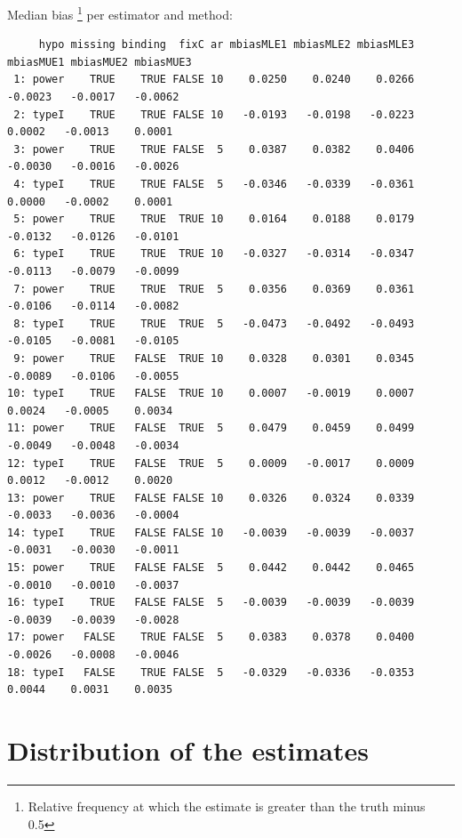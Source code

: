 \documentclass[12pt]{article}
\begin{document}
Median bias \footnote{Relative frequency at which the estimate is greater than the truth minus 0.5} per estimator and method:
\begin{adjustwidth}{-1cm}{-1cm}
\begin{verbatim}
     hypo missing binding  fixC ar mbiasMLE1 mbiasMLE2 mbiasMLE3 mbiasMUE1 mbiasMUE2 mbiasMUE3
 1: power    TRUE    TRUE FALSE 10    0.0250    0.0240    0.0266   -0.0023   -0.0017   -0.0062
 2: typeI    TRUE    TRUE FALSE 10   -0.0193   -0.0198   -0.0223    0.0002   -0.0013    0.0001
 3: power    TRUE    TRUE FALSE  5    0.0387    0.0382    0.0406   -0.0030   -0.0016   -0.0026
 4: typeI    TRUE    TRUE FALSE  5   -0.0346   -0.0339   -0.0361    0.0000   -0.0002    0.0001
 5: power    TRUE    TRUE  TRUE 10    0.0164    0.0188    0.0179   -0.0132   -0.0126   -0.0101
 6: typeI    TRUE    TRUE  TRUE 10   -0.0327   -0.0314   -0.0347   -0.0113   -0.0079   -0.0099
 7: power    TRUE    TRUE  TRUE  5    0.0356    0.0369    0.0361   -0.0106   -0.0114   -0.0082
 8: typeI    TRUE    TRUE  TRUE  5   -0.0473   -0.0492   -0.0493   -0.0105   -0.0081   -0.0105
 9: power    TRUE   FALSE  TRUE 10    0.0328    0.0301    0.0345   -0.0089   -0.0106   -0.0055
10: typeI    TRUE   FALSE  TRUE 10    0.0007   -0.0019    0.0007    0.0024   -0.0005    0.0034
11: power    TRUE   FALSE  TRUE  5    0.0479    0.0459    0.0499   -0.0049   -0.0048   -0.0034
12: typeI    TRUE   FALSE  TRUE  5    0.0009   -0.0017    0.0009    0.0012   -0.0012    0.0020
13: power    TRUE   FALSE FALSE 10    0.0326    0.0324    0.0339   -0.0033   -0.0036   -0.0004
14: typeI    TRUE   FALSE FALSE 10   -0.0039   -0.0039   -0.0037   -0.0031   -0.0030   -0.0011
15: power    TRUE   FALSE FALSE  5    0.0442    0.0442    0.0465   -0.0010   -0.0010   -0.0037
16: typeI    TRUE   FALSE FALSE  5   -0.0039   -0.0039   -0.0039   -0.0039   -0.0039   -0.0028
17: power   FALSE    TRUE FALSE  5    0.0383    0.0378    0.0400   -0.0026   -0.0008   -0.0046
18: typeI   FALSE    TRUE FALSE  5   -0.0329   -0.0336   -0.0353    0.0044    0.0031    0.0035
\end{verbatim}

\end{adjustwidth}

\clearpage

\section{Distribution of the estimates}
\label{sec:org4557598}
\end{document}
